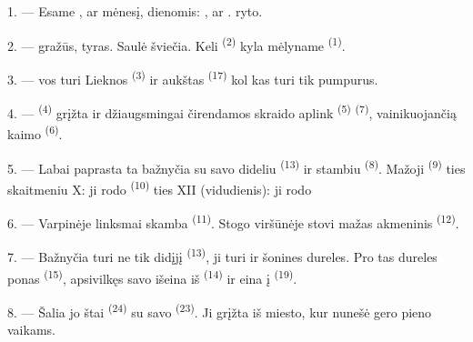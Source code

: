 \VUsaut{2.4mm}

\VUsaut{3.0mm}

1. --- Esame  ,  ar 
mėnesį,  dienomis: ,  ar
.  ryto.

2. ---  gražūs,  tyras. Saulė šviečia. Keli
 \textsuperscript{(2)} kyla mėlyname 
\textsuperscript{(1)}.

3. ---  vos turi  Lieknos 
\textsuperscript{(3)} ir aukštas  \textsuperscript{(17)} kol kas turi
tik pumpurus.

4. ---  \textsuperscript{(4)} grįžta ir džiaugsmingai čirendamos
skraido aplink  \textsuperscript{(5)} 
\textsuperscript{(7)}, vainikuojančią kaimo  \textsuperscript{(6)}.

\VUsaut{3.4mm}
\VUsaut{3.0mm}

5. --- Labai paprasta ta bažnyčia su savo dideliu 
\textsuperscript{(13)} ir stambiu  \textsuperscript{(8)}. Mažoji
 \textsuperscript{(9)} ties skaitmeniu X: ji rodo 
 \textsuperscript{(10)} ties XII (vidudienis): ji rodo

6. --- Varpinėje linksmai skamba  \textsuperscript{(11)}. Stogo
viršūnėje stovi mažas akmeninis  \textsuperscript{(12)}.

7. --- Bažnyčia turi ne tik didįjį  \textsuperscript{(13)}, ji turi
ir šonines dureles. Pro tas dureles ponas  \textsuperscript{(15)},
apsivilkęs savo  išeina iš 
\textsuperscript{(14)} ir eina į  \textsuperscript{(19)}.

8. --- Šalia jo štai  \textsuperscript{(24)} su savo
 \textsuperscript{(23)}. Ji grįžta iš miesto, kur nunešė gero pieno
vaikams.

\VUsaut{4.0mm}
\VUsaut{3.4mm}

